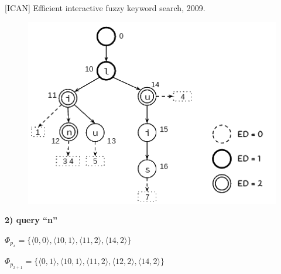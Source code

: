 \documentclass[11pt]{beamer}
\begin{document}
\begin{frame}{[ICAN] Efficient interactive fuzzy keyword search, 2009.}

    \begin{figure}
      \includegraphics[scale=0.45]{pictures/ican_3.png}
      \centering
    \end{figure}
    
    \textbf{2) query ``n''}
    
    $\Phi_{p_{x}} = \big\{ \big \langle 0, 0 \big \rangle, \big \langle 10, 1 \big \rangle, \big \langle 11, 2 \big \rangle, \big \langle 14, 2 \big \rangle \big\}$
    
    $\Phi_{p_{x+1}} = \big\{ \big \langle 0, 1 \big \rangle, \big \langle 10, 1 \big \rangle, \big \langle 11, 2 \big \rangle, \big \langle 12, 2 \big \rangle, \big \langle 14, 2 \big \rangle \big\}$
    
\end{frame}
\end{document}
